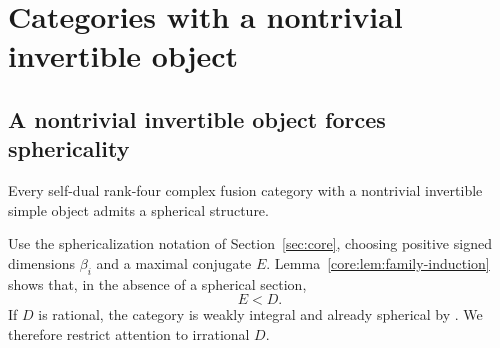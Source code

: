 \section{Categories with a nontrivial invertible object}\label{sec:inv}
\subsection{A nontrivial invertible object forces sphericality}

\begin{theorem}\label{inv:thm:rankfour-invertible-spherical}
Every self-dual rank-four complex fusion category with a nontrivial
invertible simple object admits a spherical structure.
\end{theorem}

Use the sphericalization notation of Section~\ref{sec:core},
choosing positive signed dimensions $\beta_i$ and a maximal conjugate
$E$. Lemma~\ref{core:lem:family-induction} shows that, in the absence of a spherical section,
\begin{equation}\label{inv:eq:proper-signed-strict}E<D.\end{equation}
If $D$ is rational, the
category is weakly integral and already spherical by
\cite[Propositions~8.23--8.24]{ENO}. We therefore restrict attention
to irrational $D$.



